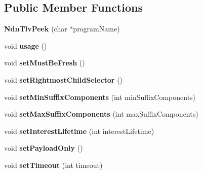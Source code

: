 \subsection*{Public Member Functions}
\begin{DoxyCompactItemize}
\item 
{\bfseries Ndn\+Tlv\+Peek} (char $\ast$program\+Name)\hypertarget{classndntlvpeek_1_1NdnTlvPeek_ac64d0fb026d27d99dd46fad217ac221e}{}\label{classndntlvpeek_1_1NdnTlvPeek_ac64d0fb026d27d99dd46fad217ac221e}

\item 
void {\bfseries usage} ()\hypertarget{classndntlvpeek_1_1NdnTlvPeek_a7cf9cda30f515045be20f8610e2def36}{}\label{classndntlvpeek_1_1NdnTlvPeek_a7cf9cda30f515045be20f8610e2def36}

\item 
void {\bfseries set\+Must\+Be\+Fresh} ()\hypertarget{classndntlvpeek_1_1NdnTlvPeek_a845bc32b322f7eca47eae1cdcb1d394f}{}\label{classndntlvpeek_1_1NdnTlvPeek_a845bc32b322f7eca47eae1cdcb1d394f}

\item 
void {\bfseries set\+Rightmost\+Child\+Selector} ()\hypertarget{classndntlvpeek_1_1NdnTlvPeek_a8272fb0e91f3d9335fa5dfe03d522213}{}\label{classndntlvpeek_1_1NdnTlvPeek_a8272fb0e91f3d9335fa5dfe03d522213}

\item 
void {\bfseries set\+Min\+Suffix\+Components} (int min\+Suffix\+Components)\hypertarget{classndntlvpeek_1_1NdnTlvPeek_a3fed7e3794d6df27e0ffc0c48284c9cd}{}\label{classndntlvpeek_1_1NdnTlvPeek_a3fed7e3794d6df27e0ffc0c48284c9cd}

\item 
void {\bfseries set\+Max\+Suffix\+Components} (int max\+Suffix\+Components)\hypertarget{classndntlvpeek_1_1NdnTlvPeek_aa4a0b4bcf0419634fa87ddc66e5bc6ef}{}\label{classndntlvpeek_1_1NdnTlvPeek_aa4a0b4bcf0419634fa87ddc66e5bc6ef}

\item 
void {\bfseries set\+Interest\+Lifetime} (int interest\+Lifetime)\hypertarget{classndntlvpeek_1_1NdnTlvPeek_a86aa30f1582ab9c626ec42d6b4bfb42b}{}\label{classndntlvpeek_1_1NdnTlvPeek_a86aa30f1582ab9c626ec42d6b4bfb42b}

\item 
void {\bfseries set\+Payload\+Only} ()\hypertarget{classndntlvpeek_1_1NdnTlvPeek_a3050c635551c86fb294206abf62032c1}{}\label{classndntlvpeek_1_1NdnTlvPeek_a3050c635551c86fb294206abf62032c1}

\item 
void {\bfseries set\+Timeout} (int timeout)\hypertarget{classndntlvpeek_1_1NdnTlvPeek_adadeb367d692574cf00302964045d317}{}\label{classndntlvpeek_1_1NdnTlvPeek_adadeb367d692574cf00302964045d317}


\end{DoxyCompactItemize}
